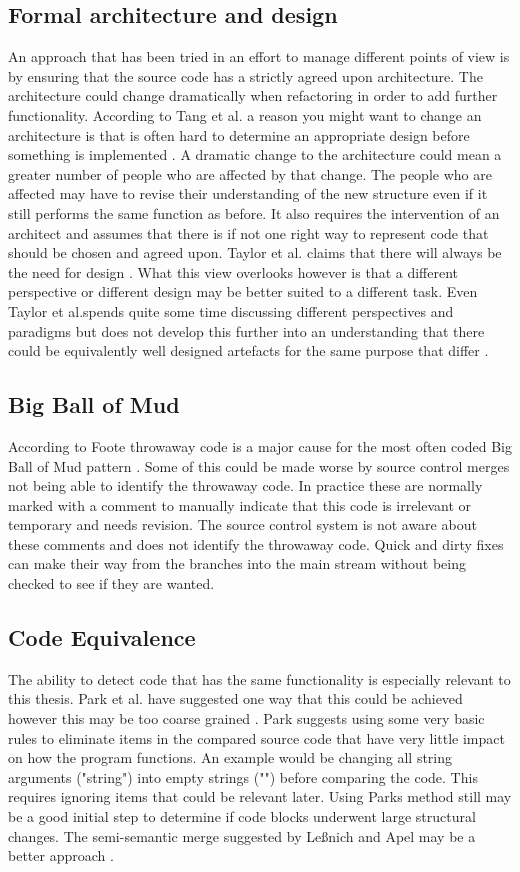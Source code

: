 \documentclass[12pt]{CRPITStyle}
\renewcommand{\cite}{\citep}
\begin{document}
\subsection{Formal architecture and design}
An approach that has been tried in an effort to manage different points of view is by ensuring that the source code has a strictly agreed upon architecture. The architecture could change dramatically when refactoring in order to add further functionality. According to Tang et al. a reason you might want to change an architecture is that is often hard to determine an appropriate design before something is implemented \cite{Tang2009}. A dramatic change to the architecture could mean a greater number of people who are affected by that change. The people who are affected may have to revise their understanding of the new structure even if it still performs the same function as before. It also requires the intervention of an architect and assumes that there is if not one right way to represent code that should be chosen and agreed upon. Taylor et al. claims that there will always be the need for design \cite{Taylor2007}. What this view overlooks however is that a different perspective or different design may be better suited to a different task. Even Taylor et al.spends quite some time discussing different perspectives and paradigms but does not develop this further into an understanding that there could be equivalently well designed artefacts for the same purpose that differ \cite{Taylor2007}.
\subsection{Big Ball of Mud}
According to Foote throwaway code is a major cause for the most often coded Big Ball of Mud pattern \cite{Foote1997}. Some of this could be made worse by source control merges not being able to identify the throwaway code. In practice these are normally marked with a comment to manually indicate that this code is irrelevant or temporary and needs revision. The source control system is not aware about these comments and does not identify the throwaway code. Quick and dirty fixes can make their way from the branches into the main stream without being checked to see if they are wanted.
\subsection{Code Equivalence}
The ability to detect code that has the same functionality is especially relevant to this thesis. Park et al. have suggested one way that this could be achieved however this may be too coarse grained \cite{Park2013}. Park suggests using some very basic rules to eliminate items in the compared source code that have very little impact on how the program functions. An example would be changing all string arguments ("string") into empty strings ("") before comparing the code. This requires ignoring items that could be relevant later. Using Parks method still may be a good initial step to determine if code blocks underwent large structural changes. The semi-semantic merge suggested by Le{\ss}nich and Apel may be a better approach \cite{LeBenich2012} \cite{Apel2011}.
\end{document}
